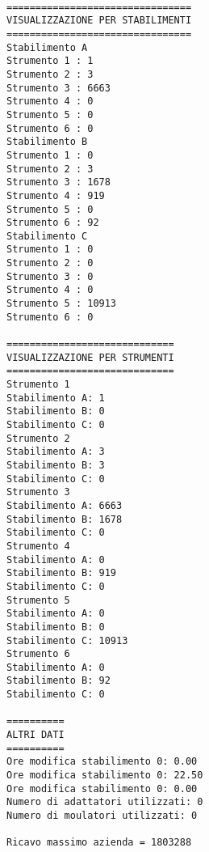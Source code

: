 \begin{verbatim}

================================ 
VISUALIZZAZIONE PER STABILIMENTI 
================================ 
Stabilimento A 
Strumento 1 : 1
Strumento 2 : 3
Strumento 3 : 6663
Strumento 4 : 0
Strumento 5 : 0
Strumento 6 : 0
Stabilimento B 
Strumento 1 : 0
Strumento 2 : 3
Strumento 3 : 1678
Strumento 4 : 919
Strumento 5 : 0
Strumento 6 : 92
Stabilimento C 
Strumento 1 : 0
Strumento 2 : 0
Strumento 3 : 0
Strumento 4 : 0
Strumento 5 : 10913
Strumento 6 : 0

============================= 
VISUALIZZAZIONE PER STRUMENTI 
============================= 
Strumento 1 
Stabilimento A: 1 
Stabilimento B: 0 
Stabilimento C: 0 
Strumento 2 
Stabilimento A: 3 
Stabilimento B: 3 
Stabilimento C: 0 
Strumento 3 
Stabilimento A: 6663 
Stabilimento B: 1678 
Stabilimento C: 0 
Strumento 4 
Stabilimento A: 0 
Stabilimento B: 919 
Stabilimento C: 0 
Strumento 5 
Stabilimento A: 0 
Stabilimento B: 0 
Stabilimento C: 10913 
Strumento 6 
Stabilimento A: 0 
Stabilimento B: 92 
Stabilimento C: 0 

========== 
ALTRI DATI 
========== 
Ore modifica stabilimento 0: 0.00 
Ore modifica stabilimento 0: 22.50 
Ore modifica stabilimento 0: 0.00 
Numero di adattatori utilizzati: 0 
Numero di moulatori utilizzati: 0 
 
Ricavo massimo azienda = 1803288 
\end{verbatim}